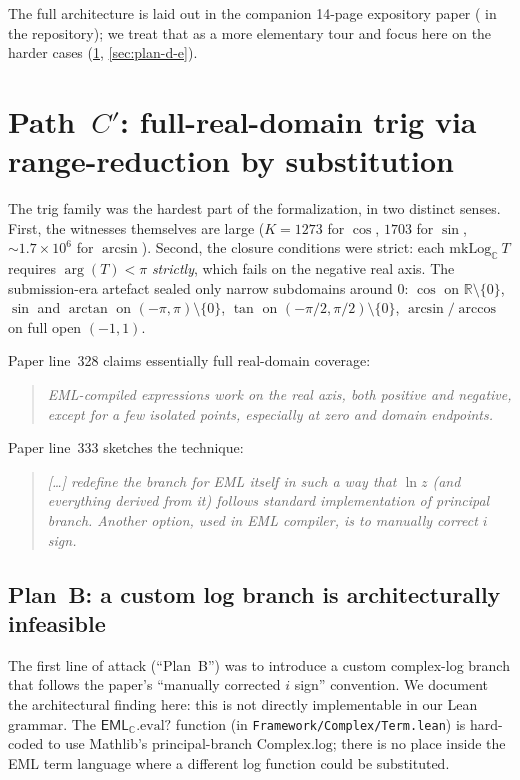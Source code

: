 \documentclass[11pt,a4paper]{article}
\newcommand{\EMLC}{\mathsf{EML}_{\mathbb{C}}}
\theoremstyle{plain}
\theoremstyle{definition}
\begin{document}
The full architecture is laid out in the companion 14-page expository
paper \cite{naskrecki2026notes} (
in the repository); we treat that as a more elementary tour and focus
here on the harder cases (\cref{sec:path-c-prime}, \cref{sec:plan-d-e}).

\section{\texorpdfstring{Path~$C'$}{Path C'}: full-real-domain trig
via range-reduction by substitution}
\label{sec:path-c-prime}

The trig family was the hardest part of the formalization, in two
distinct senses. First, the witnesses themselves are large
($K = 1273$ for $\cos$, $1703$ for $\sin$, $\sim\!1.7 \times 10^6$ for
$\arcsin$). Second, the closure conditions were strict: each
$\mathrm{mkLog}_{\mathbb{C}}\ T$ requires $\arg(T) < \pi$ \emph{strictly},
which fails on the negative real axis. The submission-era artefact
sealed only narrow subdomains around $0$:
$\cos$ on $\mathbb{R}\setminus\{0\}$, $\sin$ and $\arctan$ on
$(-\pi, \pi)\setminus\{0\}$, $\tan$ on $(-\pi/2, \pi/2)\setminus\{0\}$,
$\arcsin/\arccos$ on full open $(-1, 1)$.

Paper line~328 claims essentially full real-domain coverage:

\begin{quote}\itshape
EML-compiled expressions work on the real axis, both positive and
negative, except for a few isolated points, especially at zero and
domain endpoints.
\end{quote}

Paper line~333 sketches the technique:

\begin{quote}\itshape
[\dots] redefine the branch for EML itself in such a way that
$\ln z$ (and everything derived from it) follows standard
implementation of principal branch. Another option, used in EML
compiler, is to manually correct $i$ sign.
\end{quote}

\subsection{Plan~B: a custom log branch is architecturally infeasible}

The first line of attack (``Plan~B'') was to introduce a custom
complex-log branch that follows the paper's ``manually corrected $i$
sign'' convention. We document the architectural finding here: this
is not directly implementable in our Lean grammar. The
$\EMLC.\mathrm{eval?}$ function (in
\texttt{Framework/Complex/Term.lean}) is hard-coded to use Mathlib's
principal-branch $\mathrm{Complex.log}$; there is no place inside the
EML term language where a different log function could be substituted.
\end{document}
